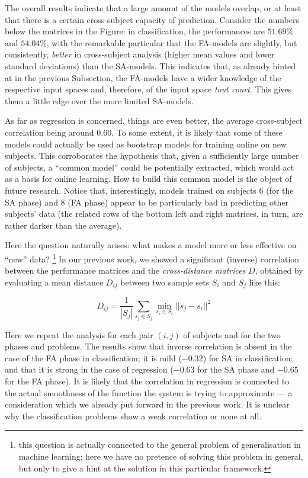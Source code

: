 The overall results indicate that a large amount of the models
overlap, or at least that there is a certain cross-subject capacity of
prediction. Consider the numbers below the matrices in the Figure: in
classification, the performances are $51.69\%$ and $54.04\%$, with the
remarkable particular that the FA-models are slightly, but
consistently, \emph{better} in cross-subject analysis (higher mean
values and lower standard deviations) than the SA-models. This
indicates that, as already hinted at in the previous Subsection, the
FA-models have a wider knowledge of the respective input spaces and,
therefore, of the input space \emph{tout court}. This gives them a
little edge over the more limited SA-models.

As far as regression is concerned, things are even better, the average
cross-subject correlation being around $0.60$. To some extent, it is
likely that some of these models could actually be used as bootstrap
models for training online on new subjects. This corroborates the
hypothesis that, given a sufficiently large number of subjects, a
``common model'' could be potentially extracted, which would act as a
basis for online learning. How to build this common model is the
object of future research. Notice that, interestingly, models trained
on subjects $6$ (for the SA phase) and $8$ (FA phase) appear to be
particularly bad in predicting other subjects' data (the related rows
of the bottom left and right matrices, in turn, are rather darker than
the average).

Here the question naturally arises: what makes a model more or less
effective on ``new'' data? \footnote{this question is actually
connected to the general problem of generalisation in machine
learning; here we have no pretence of solving this problem in general,
but only to give a hint at the solution in this particular framework.}
In our previous work, we showed a significant (inverse) correlation
between the performance matrices and the \emph{cross-distance
matrices} $D$, obtained by evaluating a mean distance $D_{ij}$ between
two sample sets $S_i$ and $S_j$ like this:

$$ D_{ij} = \frac{1}{|S_j|} \sum_{s_j \in S_j}{\min_{s_i \in S_i}{ ||s_j-s_i||^2 } } $$

Here we repeat the analysis for each pair $(i,j)$ of subjects and for
the two phases and problems. The results show that inverse correlation
is absent in the case of the FA phase in classification; it is mild
($-0.32$) for SA in classification; and that it is strong in the case
of regression ($-0.63$ for the SA phase and $-0.65$ for the FA
phase). It is likely that the correlation in regression is connected
to the actual smoothness of the function the system is trying to
approximate --- a consideration which we already put forward in the
previous work. It is unclear why the classification problems show a
weak correlation or none at all.
